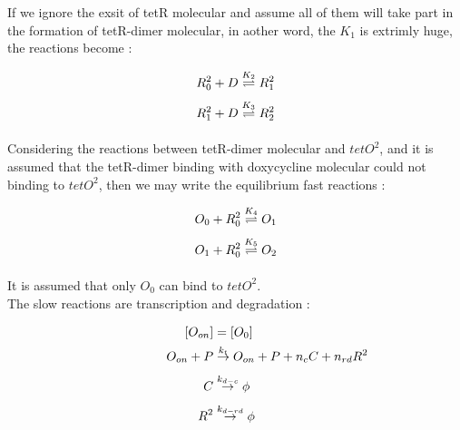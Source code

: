 If we ignore the exsit of tetR molecular and assume all of them will take part in the formation of tetR-dimer molecular, in aother word, the $K_1$ is extrimly huge, the reactions become : 

\begin{equation} 
\begin{aligned} 
\centering
R^2_0 + D  &\underset{}{\overset{K_2}{\rightleftharpoons}} R^2_1 \\ 
R^2_1 + D  &\underset{}{\overset{K_3}{\rightleftharpoons}} R^2_2 \\  
\end{aligned} 
\end{equation}

Considering the reactions between tetR-dimer molecular and $tetO^{2}$, and it is assumed that the tetR-dimer binding with doxycycline molecular could not binding to $tetO^{2}$, then we may write the equilibrium fast reactions :

\begin{equation} 
\begin{aligned} 
\centering
O_0 + R^2_0  &\underset{}{\overset{K_4}{\rightleftharpoons}} O_1 \\ 
O_1 + R^2_0  &\underset{}{\overset{K_5}{\rightleftharpoons}} O_2 \\  
\end{aligned} 
\end{equation}

It is assumed that only $O_0$ can bind to $tetO^{2}$. \\
The slow reactions are transcription and degradation :

\begin{equation} 
\centering
\begin{aligned} 
\qquad \qquad \quad[O_{on}]    &= [O_0] \\
\qquad \qquad \quad O_{on} + P &\underset{}{\overset{k_t}{\rightarrow}} 
O_{on} + P + n_cC + n_{rd}R^2\\ 
\qquad \qquad \quad C          &\underset{}{\overset{k_{d-c}}{\rightarrow}} 
\phi \\  
\qquad \qquad \quad R^2      &\underset{}{\overset{k_{d-rd}}{\rightarrow}} 
\phi \\  
\end{aligned} 
\end{equation}

